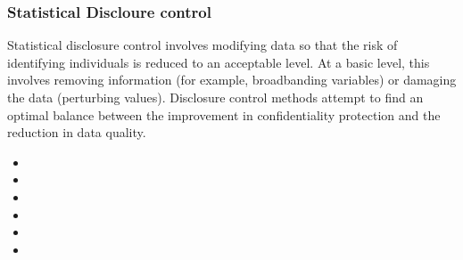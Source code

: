 \begin{frame}[fragile]

\frametitle{Statistical Discloure control}

Statistical disclosure control involves modifying data so that the risk of identifying individuals is reduced to an acceptable level. At a basic level, this involves removing information (for example, broadbanding variables) or damaging the data (perturbing values). Disclosure control methods attempt to find an optimal balance between the improvement in confidentiality protection and the reduction in data quality. 


\end{frame}
\begin{frame}[fragile]


\begin{itemize}
\item
\item
\item
\item
\item
\item
\end{itemize}


\end{frame}
